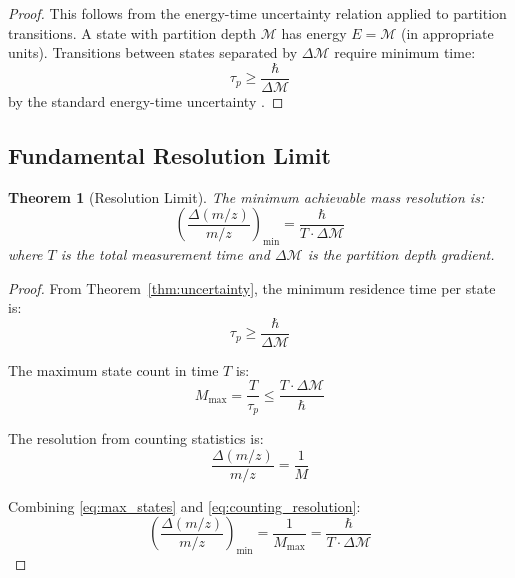 \documentclass[twocolumn,10pt,a4paper]{article}
\newtheorem{theorem}{Theorem}[section]
\theoremstyle{definition}
\theoremstyle{remark}
\newcommand{\Mdepth}{\mathcal{M}}
\newcommand{\taup}{\tau_p}
\begin{document}
\begin{proof}
This follows from the energy-time uncertainty relation applied to partition transitions. A state with partition depth $\Mdepth$ has energy $E = \Mdepth$ (in appropriate units). Transitions between states separated by $\Delta\Mdepth$ require minimum time:
\begin{equation}
    \taup \geq \frac{\hbar}{\Delta\Mdepth}
\end{equation}
by the standard energy-time uncertainty \citep{mandelstam1991}.
\end{proof}

\subsection{Fundamental Resolution Limit}

\begin{theorem}[Resolution Limit]
\label{thm:resolution}
The minimum achievable mass resolution is:
\begin{equation}
    \boxed{\left(\frac{\Delta(m/z)}{m/z}\right)_{\min} = \frac{\hbar}{T \cdot \Delta\Mdepth}}
    \label{eq:resolution_limit}
\end{equation}
where $T$ is the total measurement time and $\Delta\Mdepth$ is the partition depth gradient.
\end{theorem}

\begin{proof}
From Theorem~\ref{thm:uncertainty}, the minimum residence time per state is:
\begin{equation}
    \taup \geq \frac{\hbar}{\Delta\Mdepth}
\end{equation}

The maximum state count in time $T$ is:
\begin{equation}
    M_{\max} = \frac{T}{\taup} \leq \frac{T \cdot \Delta\Mdepth}{\hbar}
    \label{eq:max_states}
\end{equation}

The resolution from counting statistics is:
\begin{equation}
    \frac{\Delta(m/z)}{m/z} = \frac{1}{M}
    \label{eq:counting_resolution}
\end{equation}

Combining \eqref{eq:max_states} and \eqref{eq:counting_resolution}:
\begin{equation}
    \left(\frac{\Delta(m/z)}{m/z}\right)_{\min} = \frac{1}{M_{\max}} = \frac{\hbar}{T \cdot \Delta\Mdepth}
\end{equation}
\end{proof}
\end{document}
